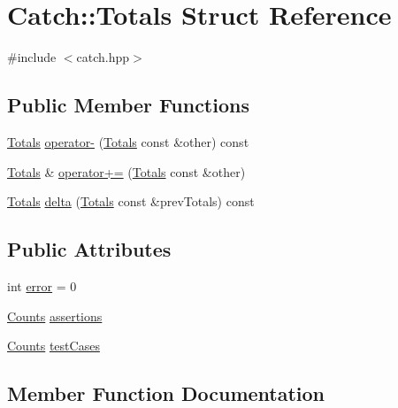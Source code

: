 \hypertarget{struct_catch_1_1_totals}{}\section{Catch\+:\+:Totals Struct Reference}
\label{struct_catch_1_1_totals}


{\ttfamily \#include $<$catch.\+hpp$>$}

\subsection*{Public Member Functions}
\begin{DoxyCompactItemize}
\item 
\mbox{\hyperlink{struct_catch_1_1_totals}{Totals}} \mbox{\hyperlink{struct_catch_1_1_totals_a9279ed39139cb7e7b291918a6d08290e}{operator-\/}} (\mbox{\hyperlink{struct_catch_1_1_totals}{Totals}} const \&other) const
\item 
\mbox{\hyperlink{struct_catch_1_1_totals}{Totals}} \& \mbox{\hyperlink{struct_catch_1_1_totals_a574015076e54cc405c70b053e3356e43}{operator+=}} (\mbox{\hyperlink{struct_catch_1_1_totals}{Totals}} const \&other)
\item 
\mbox{\hyperlink{struct_catch_1_1_totals}{Totals}} \mbox{\hyperlink{struct_catch_1_1_totals_a1a94a654f5f3786b75695e081fc9bca2}{delta}} (\mbox{\hyperlink{struct_catch_1_1_totals}{Totals}} const \&prev\+Totals) const
\end{DoxyCompactItemize}
\subsection*{Public Attributes}
\begin{DoxyCompactItemize}
\item 
int \mbox{\hyperlink{struct_catch_1_1_totals_a6ea14c7de7ea735a14f172a26e08a239}{error}} = 0
\item 
\mbox{\hyperlink{struct_catch_1_1_counts}{Counts}} \mbox{\hyperlink{struct_catch_1_1_totals_a885ded66df752147b30c3d45aa602ec9}{assertions}}
\item 
\mbox{\hyperlink{struct_catch_1_1_counts}{Counts}} \mbox{\hyperlink{struct_catch_1_1_totals_adb195fe477aedee2ecea88c888f16506}{test\+Cases}}
\end{DoxyCompactItemize}


\subsection{Member Function Documentation}
\mbox{\label{struct_catch_1_1_totals_a1a94a654f5f3786b75695e081fc9bca2}} 
